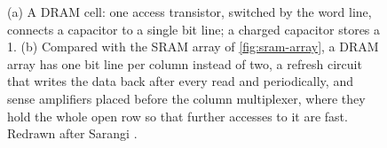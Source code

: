 \begin{figure}[htbp]
\caption[DRAM cell and array]{(a) A DRAM cell: one access transistor, switched by the word line, connects a capacitor to a single bit line; a charged capacitor stores a 1. (b) Compared with the SRAM array of \cref{fig:sram-array}, a DRAM array has one bit line per column instead of two, a refresh circuit that writes the data back after every read and periodically, and sense amplifiers placed before the column multiplexer, where they hold the whole open row so that further accesses to it are fast. Redrawn after Sarangi \cite[sec.~7.4.3, Figs.~7.30--7.31]{sarangi2025basic}.}
\label{fig:dram-array}
\end{figure}
